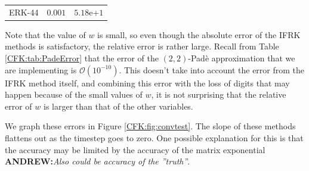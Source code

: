 \documentclass{csri19}
\newcommand{\A}[1]{\textbf{ANDREW:}\textit{#1}}
\begin{document}
\begin{table}[ht]
{{\begin{tabular}{c|c|c}
      ERK-44          & $0.001$           & $5.18$e+$1$
    \end{tabular}}}\quad
\end{table}

Note that the value of $w$ is small, so even though the absolute error 
of the IFRK methods is satisfactory, the relative error is rather
 large. Recall from Table \ref{CFK:tab:PadeError} that the error of the 
$(2,2)$-Pad\`e approximation that we are implementing is $\mathcal{O}(10^{-10})$.
This doesn't take into account the error from the IFRK method itself, 
and combining this error with the loss of digits that may happen because of 
the small values of $w$, it is not surprising that the relative error of 
$w$ is larger than that of the other variables.

We graph these errors in Figure \ref{CFK:fig:convtest}. The slope of these 
methods flattens out as the timestep goes to zero. One possible 
explanation for this is that the accuracy may be limited by the accuracy of 
the matrix exponential \A{Also could be accuracy of the ''truth''}.
\end{document}
